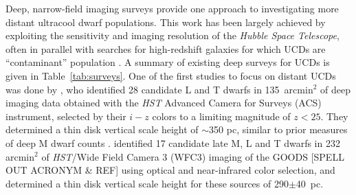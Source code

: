 \documentclass[manuscript]{aastex63}
\begin{document}
Deep, narrow-field imaging surveys provide one approach to investigating more distant ultracool dwarf populations. This work has been largely achieved by exploiting the sensitivity and imaging resolution of the {\em Hubble Space Telescope}, often in parallel with searches for high-redshift galaxies for which UCDs are ``contaminant'' population \citep{1996AJ....112.1472R}. A summary of existing deep surveys for UCDs is given in Table~\ref{tab:surveys}.
One of the first studies to focus on distant UCDs was done by \cite{2005ApJ...631L.159R}, who identified 28 candidate L and T dwarfs in 135~arcmin$^2$ of deep imaging data obtained with the {\em HST} Advanced Camera for Surveys (ACS) instrument, selected by their \textit{$i-z$} colors to a limiting magnitude of $z < 25$. They  determined a thin disk vertical scale height of $\sim$350 pc, similar to prior measures of deep M dwarf counts \citep{1997ApJ...482..913G,1997A&A...328....5K, 1997A&A...328...83C}. 
\cite{Ryan2011} identified 17 candidate late M, L and T dwarfs in 232 arcmin$^2$ of {\em HST}/Wide Field Camera 3 (WFC3) imaging of the GOODS [SPELL OUT ACRONYM \& REF] using optical and near-infrared color selection, and determined a thin disk vertical scale height for these sources of 290$\pm$40~pc.
\end{document}
